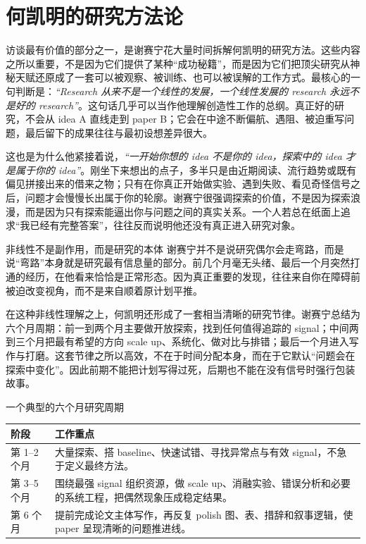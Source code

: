 \section{何凯明的研究方法论}

访谈最有价值的部分之一，是谢赛宁花大量时间拆解何凯明的研究方法。这些内容之所以重要，不是因为它们提供了某种“成功秘籍”，而是因为它们把顶尖研究从神秘天赋还原成了一套可以被观察、被训练、也可以被误解的工作方式。最核心的一句判断是：\textit{``Research 从来不是一个线性的发展，一个线性发展的 research 永远不是好的 research''}。这句话几乎可以当作他理解创造性工作的总纲。真正好的研究，不会从 idea A 直线走到 paper B；它会在中途不断偏航、遇阻、被迫重写问题，最后留下的成果往往与最初设想差异很大。

这也是为什么他紧接着说，\textit{``一开始你想的 idea 不是你的 idea，探索中的 idea 才是属于你的 idea''}。刚坐下来想出的点子，多半只是由近期阅读、流行趋势或既有偏见拼接出来的借来之物；只有在你真正开始做实验、遇到失败、看见奇怪信号之后，问题才会慢慢长出属于你的轮廓。谢赛宁很强调探索的价值，不是因为探索浪漫，而是因为只有探索能逼出你与问题之间的真实关系。一个人若总在纸面上追求“我已经有完整答案”，往往反而说明他还没有真正进入研究对象。

\begin{importantbox}{非线性不是副作用，而是研究的本体}
谢赛宁并不是说研究偶尔会走弯路，而是说“弯路”本身就是研究最有信息量的部分。前几个月毫无头绪、最后一个月突然打通的经历，在他看来恰恰是正常形态。因为真正重要的发现，往往来自你在障碍前被迫改变视角，而不是来自顺着原计划平推。
\end{importantbox}

在这种非线性理解之上，何凯明还形成了一套相当清晰的研究节律。谢赛宁总结为六个月周期：前一到两个月主要做开放探索，找到任何值得追踪的 signal；中间两到三个月把最有希望的方向 scale up、系统化、做对比与排错；最后一个月进入写作与打磨。这套节律之所以高效，不在于时间分配本身，而在于它默认“问题会在探索中变化”。因此前期不能把计划写得过死，后期也不能在没有信号时强行包装故事。

\begin{knowledgebox}{一个典型的六个月研究周期}
\begin{tabularx}{\textwidth}{>{\raggedright\arraybackslash}p{} Y}
\toprule
阶段 & 工作重点 \\
\midrule
第 1--2 个月 & 大量探索、搭 baseline、快速试错、寻找异常点与有效 signal，不急于定义最终方法。 \\
第 3--5 个月 & 围绕最强 signal 组织资源，做 scale up、消融实验、错误分析和必要的系统工程，把偶然现象压成稳定结果。 \\
第 6 个月 & 提前完成论文主体写作，再反复 polish 图、表、措辞和叙事逻辑，使 paper 呈现清晰的问题推进线。 \\
\bottomrule
\end{tabularx}
\end{knowledgebox}

